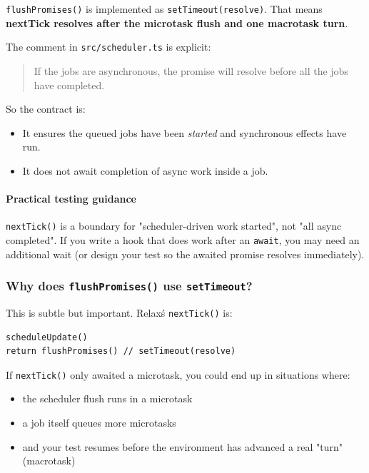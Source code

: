 \texttt{flushPromises()} is implemented as \texttt{setTimeout(resolve)}.
That means \textbf{nextTick resolves after the microtask flush and one macrotask turn}.

The comment in \texttt{src/scheduler.ts} is explicit:

\begin{quote}
If the jobs are asynchronous, the promise will resolve before all the jobs have completed.
\end{quote}

So the contract is:

\begin{itemize}
  \item It ensures the queued jobs have been \emph{started} and synchronous effects have run.
  \item It does not await completion of async work inside a job.
\end{itemize}

\paragraph{Practical testing guidance}


    \texttt{nextTick()} is a boundary for "scheduler-driven work started", not "all async completed".
If you write a hook that does work after an \texttt{await}, you may need an additional wait (or design your test so the awaited promise resolves immediately).

\subsubsection{Why does \texttt{flushPromises()} use \texttt{setTimeout}?}

This is subtle but important.
Relax\'s \texttt{nextTick()} is:

\begin{verbatim}
scheduleUpdate()
return flushPromises() // setTimeout(resolve)
\end{verbatim}

If \texttt{nextTick()} only awaited a microtask, you could end up in situations where:

\begin{itemize}
  \item the scheduler flush runs in a microtask
  \item a job itself queues more microtasks
  \item and your test resumes before the environment has advanced a real "turn" (macrotask)
\end{itemize}

